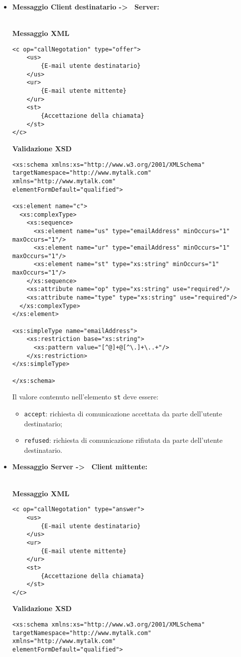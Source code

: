 {{\begin{itemize}
			\item[] \textbf{Messaggio Client destinatario -\textgreater~ Server:}{\\
			\textbf{Messaggio XML}\\
				\begin{lstlisting}
<c op="callNegotation" type="offer">
	<us>
		{E-mail utente destinatario}
	</us>
	<ur>
		{E-mail utente mittente}
	</ur>
	<st>
		{Accettazione della chiamata}
	</st>
</c>
				\end{lstlisting}
				\textbf{Validazione XSD}\\
				\begin{lstlisting}
<xs:schema xmlns:xs="http://www.w3.org/2001/XMLSchema"
targetNamespace="http://www.mytalk.com"
xmlns="http://www.mytalk.com"
elementFormDefault="qualified">

<xs:element name="c">
  <xs:complexType>
    <xs:sequence>
      <xs:element name="us" type="emailAddress" minOccurs="1" maxOccurs="1"/>
      <xs:element name="ur" type="emailAddress" minOccurs="1" maxOccurs="1"/>
      <xs:element name="st" type="xs:string" minOccurs="1" maxOccurs="1"/>
    </xs:sequence>
    <xs:attribute name="op" type="xs:string" use="required"/>
    <xs:attribute name="type" type="xs:string" use="required"/>
  </xs:complexType>
</xs:element>

<xs:simpleType name="emailAddress"> 
    <xs:restriction base="xs:string"> 
      <xs:pattern value="[^@]+@[^\.]+\..+"/> 
    </xs:restriction> 
</xs:simpleType> 

</xs:schema>
				\end{lstlisting}
				Il valore contenuto nell'elemento \texttt{st} deve essere:
				\begin{itemize}
					\item \texttt{accept}: richiesta di comunicazione accettata da parte dell'utente destinatario;
					\item \texttt{refused}: richiesta di comunicazione rifiutata da parte dell'utente destinatario.
				\end{itemize}
				}
				
				\item[] \textbf{Messaggio Server -\textgreater~ Client mittente:}{\\
				\textbf{Messaggio XML}\\
				\begin{lstlisting}
<c op="callNegotation" type="answer">
	<us>
		{E-mail utente destinatario}
	</us>
	<ur>
		{E-mail utente mittente}
	</ur>
	<st>
		{Accettazione della chiamata}
	</st>
</c>
				\end{lstlisting}
				\textbf{Validazione XSD}\\
				\begin{lstlisting}
<xs:schema xmlns:xs="http://www.w3.org/2001/XMLSchema"
targetNamespace="http://www.mytalk.com"
xmlns="http://www.mytalk.com"
elementFormDefault="qualified">


\end{lstlisting}}
\end{itemize}}}
